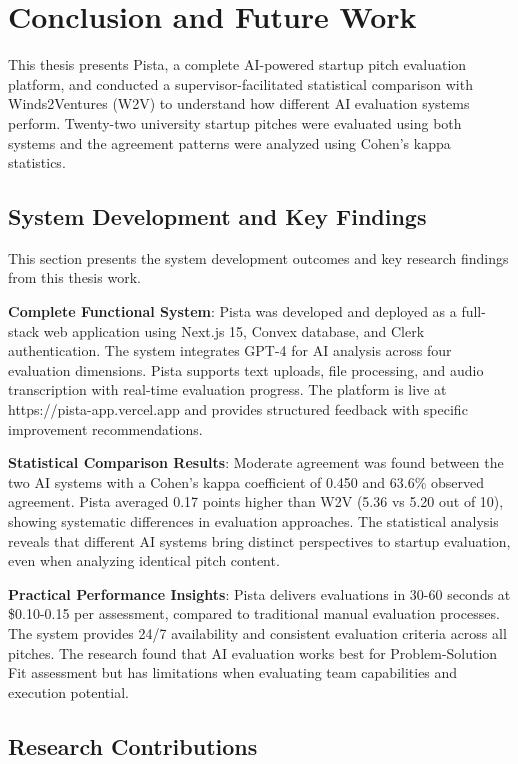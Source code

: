 \chapter{Conclusion and Future Work}
\label{ch:conclusion}

This thesis presents Pista, a complete AI-powered startup pitch evaluation platform, and conducted a supervisor-facilitated statistical comparison with Winds2Ventures (W2V) to understand how different AI evaluation systems perform. Twenty-two university startup pitches were evaluated using both systems and the agreement patterns were analyzed using Cohen's kappa statistics.

\section{System Development and Key Findings}
\label{sec:accomplishments}

This section presents the system development outcomes and key research findings from this thesis work.

\textbf{Complete Functional System}: Pista was developed and deployed as a full-stack web application using Next.js 15, Convex database, and Clerk authentication. The system integrates GPT-4 for AI analysis across four evaluation dimensions. Pista supports text uploads, file processing, and audio transcription with real-time evaluation progress. The platform is live at https://pista-app.vercel.app and provides structured feedback with specific improvement recommendations.

\textbf{Statistical Comparison Results}: Moderate agreement was found between the two AI systems with a Cohen's kappa coefficient of 0.450 and 63.6\% observed agreement. Pista averaged 0.17 points higher than W2V (5.36 vs 5.20 out of 10), showing systematic differences in evaluation approaches. The statistical analysis reveals that different AI systems bring distinct perspectives to startup evaluation, even when analyzing identical pitch content.

\textbf{Practical Performance Insights}: Pista delivers evaluations in 30-60 seconds at \$0.10-0.15 per assessment, compared to traditional manual evaluation processes. The system provides 24/7 availability and consistent evaluation criteria across all pitches. The research found that AI evaluation works best for Problem-Solution Fit assessment but has limitations when evaluating team capabilities and execution potential.

\section{Research Contributions}
\label{sec:contributions}

